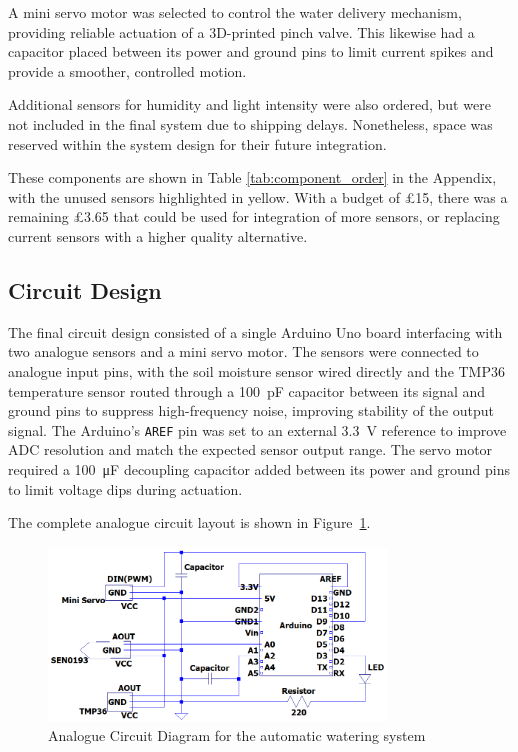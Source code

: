 \documentclass[a4paper,11pt]{article}
\begin{document}
A mini servo motor was selected to control the water delivery mechanism, 
providing reliable actuation of a 3D-printed pinch valve.
This likewise had a capacitor placed between its power and ground pins 
to limit current spikes and provide a smoother, controlled motion.

Additional sensors for humidity and light intensity were also ordered, 
but were not included in the final system due to shipping delays. 
Nonetheless, space was reserved within the system design 
for their future integration.

These components are shown in Table \ref{tab:component_order} in the Appendix,
with the unused sensors highlighted in yellow.
With a budget of £15, there was a remaining £3.65 
that could be used for integration of more sensors,
or replacing current sensors with a higher quality alternative.

\subsection{Circuit Design}
\label{sec:circuit_design}

The final circuit design consisted of a single Arduino Uno board interfacing 
with two analogue sensors and a mini servo motor. The sensors were connected 
to analogue input pins, with the soil moisture sensor wired directly and the 
TMP36 temperature sensor routed through a \SI{100}{\pico\farad} capacitor 
between its signal and ground pins to suppress high-frequency noise,
improving stability of the output signal. 
The Arduino's \texttt{AREF} pin was set to an external \SI{3.3}{\volt} reference 
to improve ADC resolution and match the expected sensor output range.
The servo motor required a \SI{100}{\micro\farad} decoupling capacitor added between 
its power and ground pins to limit voltage dips during actuation.

The complete analogue circuit layout is shown in 
Figure~\ref{fig:Analogue_Circuit_Diagram_for_the_automatic_watering_system}.

\begin{figure}[H]
    \centering
    \includegraphics[width=0.8\textwidth]{Analogue Circuit Diagram - final.png}
    \caption{Analogue Circuit Diagram for the automatic watering system}
    \label{fig:Analogue_Circuit_Diagram_for_the_automatic_watering_system}
\end{figure}
\end{document}
